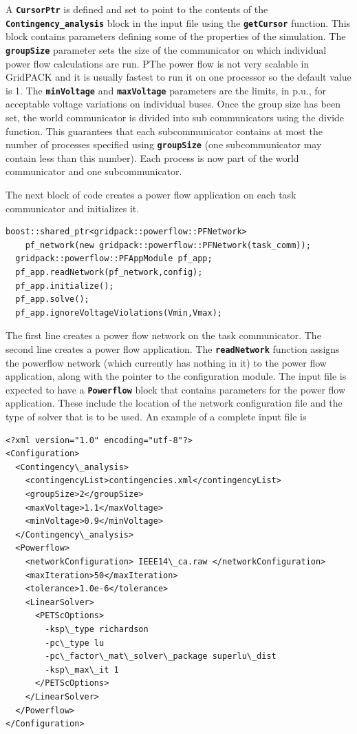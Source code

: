 \documentclass[12pt]{report} %
\begin{document}
A \texttt{\textbf{CursorPtr}} is defined and set to point to the contents of the \texttt{\textbf{Contingency\_analysis}} block in the input file using the \texttt{\textbf{getCursor}} function. This block contains parameters defining some of the properties of the simulation. The \texttt{\textbf{groupSize}} parameter sets the size of the communicator on which individual power flow calculations are run. PThe power flow is not very scalable in GridPACK and it is usually fastest to run it on one processor so the default value is 1. The \texttt{\textbf{minVoltage}} and \texttt{\textbf{maxVoltage}} parameters are the limits, in p.u., for acceptable voltage variations on individual buses. Once the group size has been set, the world communicator is divided into sub communicators using the divide function. This guarantees that each subcommunicator contains at most the number of processes specified using \texttt{\textbf{groupSize}} (one subcommunicator may contain less than this number). Each process is now part of the world communicator and one subcommunicator.

The next block of code creates a power flow application on each task communicator and initializes it.

{
\color{red}
\begin{Verbatim}[fontseries=b]
  boost::shared_ptr<gridpack::powerflow::PFNetwork>
    pf_network(new gridpack::powerflow::PFNetwork(task_comm));
  gridpack::powerflow::PFAppModule pf_app;
  pf_app.readNetwork(pf_network,config);
  pf_app.initialize();
  pf_app.solve();
  pf_app.ignoreVoltageViolations(Vmin,Vmax);
\end{Verbatim}
}

The first line creates a power flow network on the task communicator. The second line creates a power flow application. The \texttt{\textbf{readNetwork}} function assigns the powerflow network (which currently has nothing in it) to the power flow application, along with the pointer to the configuration module. The input file is expected to have a \texttt{\textbf{Powerflow}} block that contains parameters for the  power flow application. These include the location of the network configuration file and the type of solver that is to be used. An example of a complete input file is

{
\color{red}
\begin{Verbatim}[fontseries=b]
<?xml version="1.0" encoding="utf-8"?>
<Configuration>
  <Contingency\_analysis>
    <contingencyList>contingencies.xml</contingencyList>
    <groupSize>2</groupSize>
    <maxVoltage>1.1</maxVoltage>
    <minVoltage>0.9</minVoltage>
  </Contingency\_analysis>
  <Powerflow>
    <networkConfiguration> IEEE14\_ca.raw </networkConfiguration>
    <maxIteration>50</maxIteration>
    <tolerance>1.0e-6</tolerance>
    <LinearSolver>
      <PETScOptions>
        -ksp\_type richardson
        -pc\_type lu
        -pc\_factor\_mat\_solver\_package superlu\_dist
        -ksp\_max\_it 1
      </PETScOptions>
    </LinearSolver>
  </Powerflow>
</Configuration>
\end{Verbatim}
}
\end{document}
